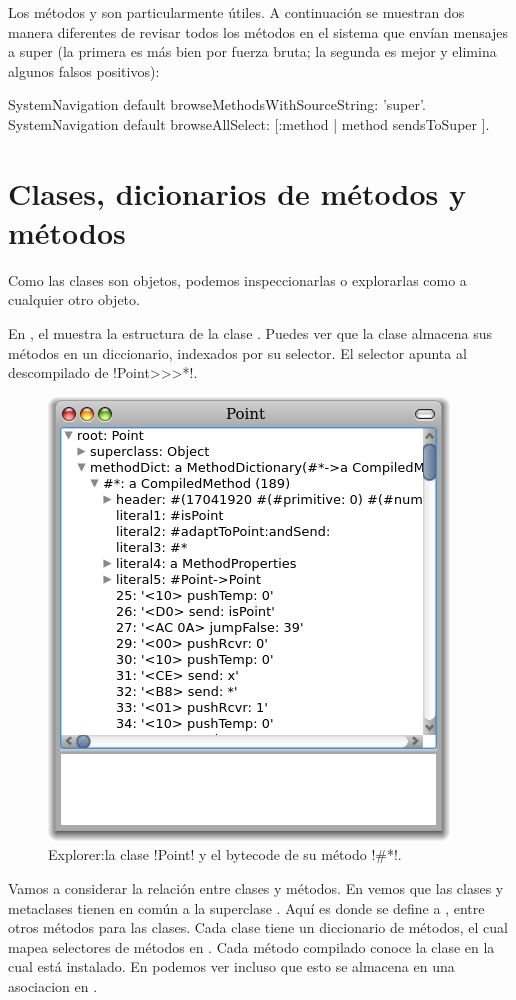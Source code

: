 \documentclass[a4paper,10pt,twoside]{book}
\begin{document}
Los métodos  y
 son particularmente útiles.  A
continuación se muestran dos manera diferentes de revisar todos los
métodos en el sistema que envían mensajes a super (la primera es más
bien por fuerza bruta; la segunda es mejor y elimina algunos falsos
positivos):
\begin{code}{}
SystemNavigation default browseMethodsWithSourceString: 'super'.
SystemNavigation default browseAllSelect: [:method | method sendsToSuper ].
\end{code}

\section{Clases, dicionarios de métodos y métodos}

Como las clases son objetos, podemos inspeccionarlas o explorarlas
como a cualquier otro objeto.


En , el  muestra la estructura de
la clase .  Puedes ver que la clase almacena sus métodos
en un diccionario, indexados por su selector.  El selector \ct{#*}
apunta al  descompilado de \ct!Point>>>*!.

\begin{figure}[ht]\centering
        \includegraphics[width=.5\linewidth]{CompiledMethod}
        \caption{Explorer:la clase \ct!Point! y el bytecode de su método \ct!\#*!.}
\end{figure}

Vamos a considerar la relación entre clases y métodos.  En
 vemos que las clases y metaclases tienen en
común a la superclase .  Aquí es donde se define a
, entre otros métodos para las clases.  Cada
clase tiene un diccionario de métodos, el cual mapea selectores de
métodos en .  Cada método compilado conoce la
clase en la cual está instalado.  En  podemos
ver incluso que esto se almacena en una asociacion en .
\end{document}
